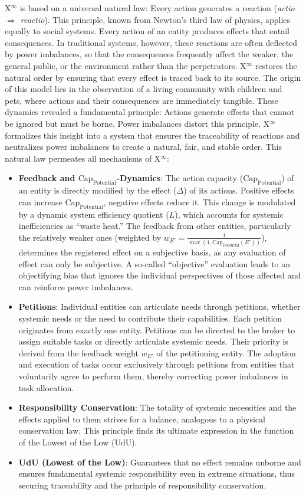 \documentclass[12pt]{scrartcl}
\begin{document}
X$^\infty$ is based on a universal natural law: Every action generates a reaction (\emph{actio $\Rightarrow$ reactio}). This principle, known from Newton’s third law of physics, applies equally to social systems. Every action of an entity produces effects that entail consequences. In traditional systems, however, these reactions are often deflected by power imbalances, so that the consequences frequently affect the weaker, the general public, or the environment rather than the perpetrators. X$^\infty$ restores the natural order by ensuring that every effect is traced back to its source. The origin of this model lies in the observation of a living community with children and pets, where actions and their consequences are immediately tangible. These dynamics revealed a fundamental principle: Actions generate effects that cannot be ignored but must be borne. Power imbalances distort this principle. X$^\infty$ formalizes this insight into a system that ensures the traceability of reactions and neutralizes power imbalances to create a natural, fair, and stable order. This natural law permeates all mechanisms of X$^\infty$:
\begin{itemize}
    \item \textbf{Feedback and $\text{Cap}_{\text{Potential}}$-Dynamics}: The action capacity ($\text{Cap}_{\text{Potential}}$) of an entity is directly modified by the effect ($\Delta$) of its actions. Positive effects can increase $\text{Cap}_{\text{Potential}}$, negative effects reduce it. This change is modulated by a dynamic system efficiency quotient ($L$), which accounts for systemic inefficiencies as “waste heat.” The feedback from other entities, particularly the relatively weaker ones (weighted by \( w_{E'} = \frac{1}{\max(1, \text{Cap}_{\text{Potential}}(E'))} \)), determines the registered effect on a subjective basis, as any evaluation of effect can only be subjective. A so-called “objective” evaluation leads to an objectifying bias that ignores the individual perspectives of those affected and can reinforce power imbalances.
    \item \textbf{Petitions}: Individual entities can articulate needs through petitions, whether systemic needs or the need to contribute their capabilities. Each petition originates from exactly one entity. Petitions can be directed to the broker to assign suitable tasks or directly articulate systemic needs. Their priority is derived from the feedback weight $w_{E'}$ of the petitioning entity. The adoption and execution of tasks occur exclusively through petitions from entities that voluntarily agree to perform them, thereby correcting power imbalances in task allocation.
    \item \textbf{Responsibility Conservation}: The totality of systemic necessities and the effects applied to them strives for a balance, analogous to a physical conservation law. This principle finds its ultimate expression in the function of the Lowest of the Low (UdU).
    \item \textbf{UdU (Lowest of the Low)}: Guarantees that no effect remains unborne and ensures fundamental systemic responsibility even in extreme situations, thus securing traceability and the principle of responsibility conservation.
\end{itemize}
\end{document}

